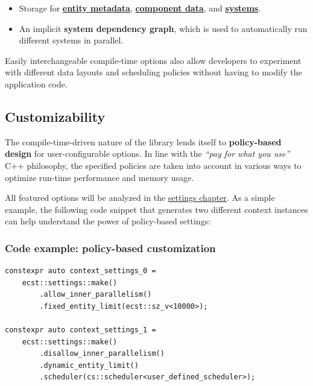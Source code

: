 \documentclass[twoside, 12pt, a4paper, openany]{book}
\begin{document}
\begin{itemize}
\item
  Storage for \protect\hyperlink{storage_entity}{\textbf{entity
  metadata}}, \protect\hyperlink{storage_component}{\textbf{component
  data}}, and \protect\hyperlink{storage_system}{\textbf{systems}}.
\item
  An implicit \textbf{system dependency graph}, which is used to
  automatically run different systems in parallel.
\end{itemize}

Easily interchangeable compile-time options also allow developers to
experiment with different data layouts and scheduling policies without
having to modify the application code.

\subsection{Customizability}\label{customizability}

The compile-time-driven nature of the library lends itself to
\textbf{policy-based design} for user-configurable options. In line with
the \emph{``pay for what you use''} C++ philosophy, the specified
policies are taken into account in various ways to optimize run-time
performance and memory usage.

All featured options will be analyzed in the
\protect\hyperlink{chap_ecst_compiletime}{settings chapter}. As a simple
example, the following code snippet that generates two different context
instances can help understand the power of policy-based settings:

\subsubsection{Code example: policy-based
customization}\label{code-example-policy-based-customization}

\begin{verbatim}
constexpr auto context_settings_0 =
    ecst::settings::make()
        .allow_inner_parallelism()
        .fixed_entity_limit(ecst::sz_v<10000>);

constexpr auto context_settings_1 =
    ecst::settings::make()
        .disallow_inner_parallelism()
        .dynamic_entity_limit()
        .scheduler(cs::scheduler<user_defined_scheduler>);
\end{verbatim}
\end{document}
